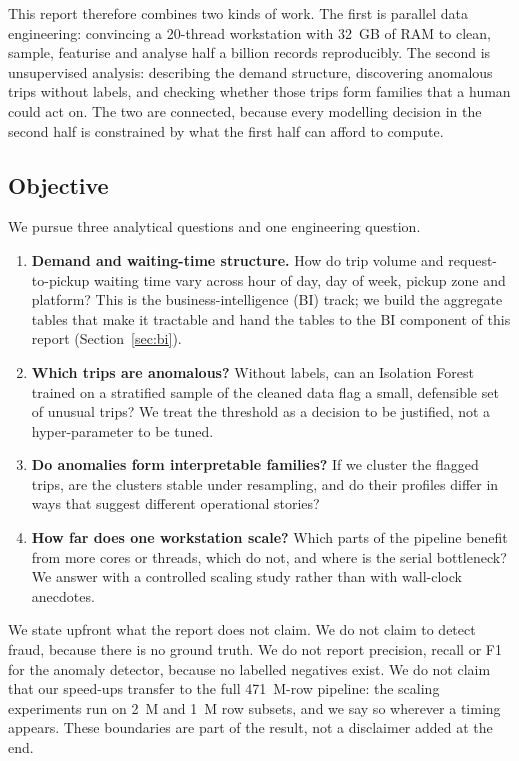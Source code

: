 \documentclass[11pt,a4paper]{article}
\begin{document}
This report therefore combines two kinds of work. The first is parallel data engineering: convincing a 20-thread workstation with 32~GB of RAM to clean, sample, featurise and analyse half a billion records reproducibly. The second is unsupervised analysis: describing the demand structure, discovering anomalous trips without labels, and checking whether those trips form families that a human could act on. The two are connected, because every modelling decision in the second half is constrained by what the first half can afford to compute.

\subsection{Objective}

We pursue three analytical questions and one engineering question.

\begin{enumerate}
\item[(a)] \textbf{Demand and waiting-time structure.} How do trip volume and request-to-pickup waiting time vary across hour of day, day of week, pickup zone and platform? This is the business-intelligence (BI) track; we build the aggregate tables that make it tractable and hand the tables to the BI component of this report (Section~\ref{sec:bi}).
\item[(b)] \textbf{Which trips are anomalous?} Without labels, can an Isolation Forest trained on a stratified sample of the cleaned data flag a small, defensible set of unusual trips? We treat the threshold as a decision to be justified, not a hyper-parameter to be tuned.
\item[(c)] \textbf{Do anomalies form interpretable families?} If we cluster the flagged trips, are the clusters stable under resampling, and do their profiles differ in ways that suggest different operational stories?
\item[(d)] \textbf{How far does one workstation scale?} Which parts of the pipeline benefit from more cores or threads, which do not, and where is the serial bottleneck? We answer with a controlled scaling study rather than with wall-clock anecdotes.
\end{enumerate}

We state upfront what the report does not claim. We do not claim to detect fraud, because there is no ground truth. We do not report precision, recall or F1 for the anomaly detector, because no labelled negatives exist. We do not claim that our speed-ups transfer to the full 471~M-row pipeline: the scaling experiments run on 2~M and 1~M row subsets, and we say so wherever a timing appears. These boundaries are part of the result, not a disclaimer added at the end.
\end{document}
